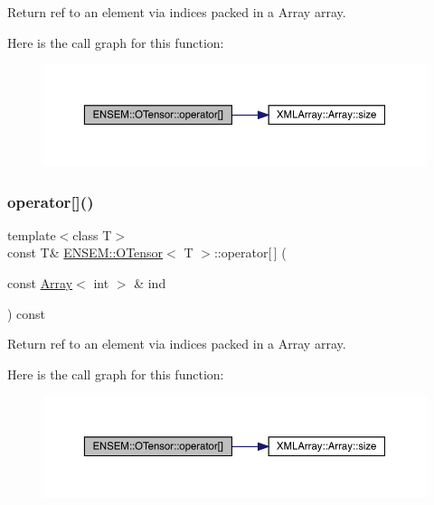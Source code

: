 Return ref to an element via indices packed in a Array array. 

Here is the call graph for this function\+:
\nopagebreak
\begin{figure}[H]
\begin{center}
\leavevmode
\includegraphics[width=350pt]{da/d8a/classENSEM_1_1OTensor_aa649ae52fc364d173eb02db2fbee8172_cgraph}
\end{center}
\end{figure}
\mbox{\label{classENSEM_1_1OTensor_aa649ae52fc364d173eb02db2fbee8172}} 
\subsubsection{\texorpdfstring{operator[]()}{operator[]()}\hspace{0.1cm}{\footnotesize\ttfamily [5/6]}}
{\footnotesize\ttfamily template$<$class T$>$ \\
const T\& \mbox{\hyperlink{classENSEM_1_1OTensor}{E\+N\+S\+E\+M\+::\+O\+Tensor}}$<$ T $>$\+::operator\mbox{[}$\,$\mbox{]} (\begin{DoxyParamCaption}\item[{const \mbox{\hyperlink{classXMLArray_1_1Array}{Array}}$<$ int $>$ \&}]{ind }\end{DoxyParamCaption}) const\hspace{0.3cm}{\ttfamily [inline]}}



Return ref to an element via indices packed in a Array array. 

Here is the call graph for this function\+:
\nopagebreak
\begin{figure}[H]
\begin{center}
\leavevmode
\includegraphics[width=350pt]{da/d8a/classENSEM_1_1OTensor_aa649ae52fc364d173eb02db2fbee8172_cgraph}
\end{center}
\end{figure}
\mbox{\label{classENSEM_1_1OTensor_aa649ae52fc364d173eb02db2fbee8172}} 
